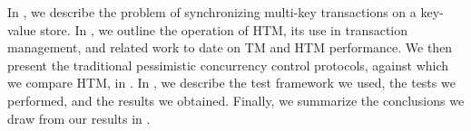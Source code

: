 In , we describe the problem of synchronizing multi-key
transactions on a key-value store. In , we outline the operation of
HTM, its use in transaction management, and related work to date on TM and HTM
performance. We then present the traditional pessimistic concurrency control
protocols, against which we compare HTM, in  . In
, we describe the test framework we used, the tests we performed,
and the results we obtained. Finally, we summarize the conclusions we draw from
our results in .
